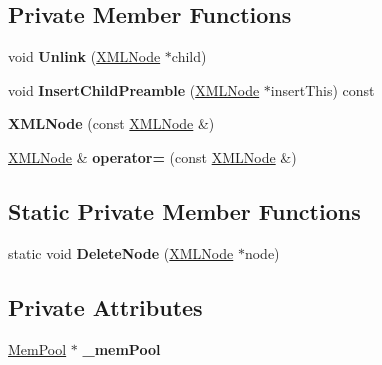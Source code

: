 \subsection*{Private Member Functions}
\begin{DoxyCompactItemize}
\item 
void {\bfseries Unlink} (\hyperlink{classtinyxml2_1_1_x_m_l_node}{X\+M\+L\+Node} $\ast$child)\hypertarget{classtinyxml2_1_1_x_m_l_node_a9546e242b6a4f232415befb1cfe0fdd4}{}\label{classtinyxml2_1_1_x_m_l_node_a9546e242b6a4f232415befb1cfe0fdd4}

\item 
void {\bfseries Insert\+Child\+Preamble} (\hyperlink{classtinyxml2_1_1_x_m_l_node}{X\+M\+L\+Node} $\ast$insert\+This) const \hypertarget{classtinyxml2_1_1_x_m_l_node_a7d048822eae74efbfc5d50ff023aef88}{}\label{classtinyxml2_1_1_x_m_l_node_a7d048822eae74efbfc5d50ff023aef88}

\item 
{\bfseries X\+M\+L\+Node} (const \hyperlink{classtinyxml2_1_1_x_m_l_node}{X\+M\+L\+Node} \&)\hypertarget{classtinyxml2_1_1_x_m_l_node_a78be01384518a969da905548f318d75b}{}\label{classtinyxml2_1_1_x_m_l_node_a78be01384518a969da905548f318d75b}

\item 
\hyperlink{classtinyxml2_1_1_x_m_l_node}{X\+M\+L\+Node} \& {\bfseries operator=} (const \hyperlink{classtinyxml2_1_1_x_m_l_node}{X\+M\+L\+Node} \&)\hypertarget{classtinyxml2_1_1_x_m_l_node_ade79231d908e1f21862819e00e56ab6e}{}\label{classtinyxml2_1_1_x_m_l_node_ade79231d908e1f21862819e00e56ab6e}

\end{DoxyCompactItemize}
\subsection*{Static Private Member Functions}
\begin{DoxyCompactItemize}
\item 
static void {\bfseries Delete\+Node} (\hyperlink{classtinyxml2_1_1_x_m_l_node}{X\+M\+L\+Node} $\ast$node)\hypertarget{classtinyxml2_1_1_x_m_l_node_af86facb14f441c2b91f3518f106dc943}{}\label{classtinyxml2_1_1_x_m_l_node_af86facb14f441c2b91f3518f106dc943}

\end{DoxyCompactItemize}
\subsection*{Private Attributes}
\begin{DoxyCompactItemize}
\item 
\hyperlink{classtinyxml2_1_1_mem_pool}{Mem\+Pool} $\ast$ {\bfseries \+\_\+mem\+Pool}\hypertarget{classtinyxml2_1_1_x_m_l_node_a4e3ff179bc312480b6bc3e57014834f7}{}\label{classtinyxml2_1_1_x_m_l_node_a4e3ff179bc312480b6bc3e57014834f7}

\end{DoxyCompactItemize}
